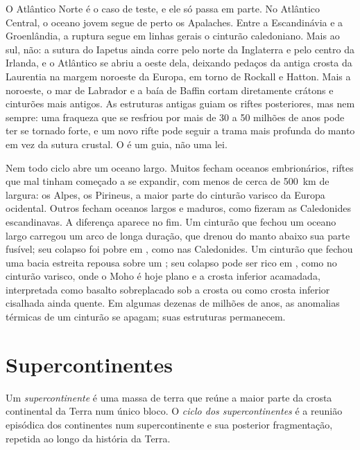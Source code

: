 O Atlântico Norte é o caso de teste, e ele só passa em parte. No Atlântico Central, o
oceano jovem segue de perto os Apalaches. Entre a Escandinávia e a Groenlândia, a ruptura
segue em linhas gerais o cinturão caledoniano. Mais ao sul, não: a sutura do Iapetus ainda corre
pelo norte da Inglaterra e pelo centro da Irlanda, e o Atlântico se abriu a oeste dela, deixando
pedaços da antiga crosta da Laurentia na margem noroeste da Europa, em torno de Rockall e Hatton.
Mais a noroeste, o mar de Labrador e a baía de Baffin cortam diretamente crátons e cinturões
mais antigos. As estruturas antigas guiam os riftes posteriores, mas nem sempre: uma fraqueza que se resfriou por mais
de 30 a 50 milhões de anos pode ter se tornado forte, e um novo rifte pode seguir a trama mais profunda
do manto em vez da sutura crustal. O  é um guia, não uma lei.

Nem todo ciclo abre um oceano largo. Muitos  fecham oceanos embrionários, riftes que mal tinham
começado a se expandir, com menos de cerca de \qty{500}{km} de largura: os Alpes, os Pirineus, a maior parte do
cinturão varisco da Europa ocidental. Outros fecham oceanos largos e maduros, como fizeram as Caledonides
escandinavas. A diferença aparece no fim. Um cinturão que fechou um oceano largo carregou um
arco de longa duração, que drenou do manto abaixo sua parte fusível; seu colapso foi pobre em
, como nas Caledonides. Um cinturão que fechou uma bacia estreita repousa sobre um ; seu
colapso pode ser rico em , como no cinturão varisco, onde o Moho é hoje plano e a
crosta inferior acamadada, interpretada como basalto sobreplacado sob a crosta ou como crosta inferior cisalhada
ainda quente. Em algumas dezenas de milhões de anos, as anomalias
térmicas de um cinturão se apagam; suas estruturas permanecem.

\section{Supercontinentes}\label{sec:b2:wilson-cycle:supercontinents}

\begin{definition}\label{def:b2:wilson-cycle:supercontinent}
Um \emph{supercontinente} é uma massa de terra que reúne a maior parte da crosta
continental da Terra num único bloco. O \emph{ciclo dos supercontinentes}
é a reunião episódica dos continentes num supercontinente e sua posterior
fragmentação, repetida ao longo da história da Terra.
\end{definition}

